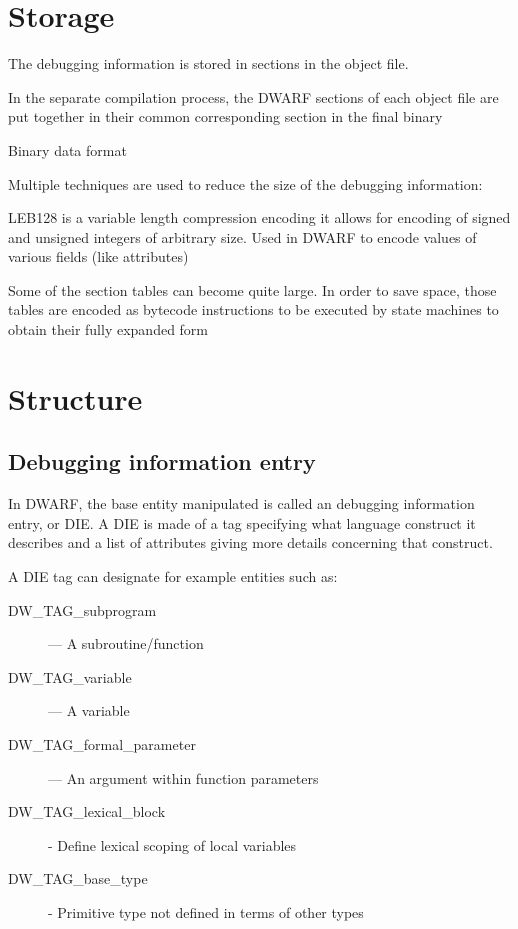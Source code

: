 \section{Storage}

The debugging information is stored in sections in the object file.

In the separate compilation process, the DWARF sections of each object file are
put together in their common corresponding section in the final binary

Binary data format

Multiple techniques are used to reduce the size of the debugging information:

LEB128 is a variable length compression encoding
it allows for encoding of signed and unsigned integers of arbitrary size.
Used in DWARF to encode values of various fields (like attributes)

Some of the section tables can become quite large.
In order to save space, those tables are encoded as bytecode instructions to be executed by state machines to obtain their fully expanded form

\section{Structure}

\subsection{Debugging information entry}

In DWARF, the base entity manipulated is called an debugging information entry, or DIE.
A DIE is made of a tag specifying what language construct it describes and a list of attributes giving more details concerning that construct.

A DIE tag can designate for example entities such as:
\begin{description}
    \item[DW\_TAG\_subprogram] — A subroutine/function
    \item[DW\_TAG\_variable] — A variable
    \item[DW\_TAG\_formal\_parameter] — An argument within function parameters
    \item[DW\_TAG\_lexical\_block] - Define lexical scoping of local variables
    \item[DW\_TAG\_base\_type] - Primitive type not defined in terms of other
        types
\end{description}

